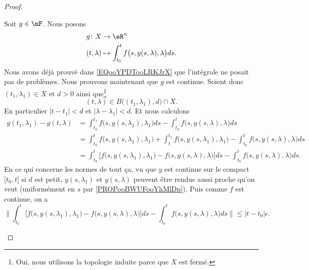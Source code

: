 \begin{proof}
\begin{subproof}
		Soit \( y\in \mF\). Nous posons
		\begin{equation}
			\begin{aligned}
				g\colon X   & \to \eR^n                                                  \\
				(t,\lambda) & \mapsto \int_{t_0}^tf\big( s,y(s,\lambda),\lambda \big)ds.
			\end{aligned}
		\end{equation}
		Nous avons déjà prouvé dans \eqref{EQooYPDTooLRKJrX} que l'intégrale ne posait pas de problèmes. Nous prouvons maintenant que \( g\) est continue. Soient donc \( (t_1,\lambda_1)\in X\) et \( d>0\) ainsi que\footnote{Oui, nous utilisons la topologie induite parce que \( X\) est fermé.}
		\begin{equation}
			(t,\lambda)\in B\big( (t_1,\lambda_1),d \big)\cap X.
		\end{equation}
		En particulier \( | t-t_1 |<d\) et \( | \lambda-\lambda_1 |<d\). Et nous calculons
		\begin{subequations}		\label{SUBEQooOBONooAnUwAO}
			\begin{align}
				g(t_1,\lambda_1)-g(t,\lambda) & =\int_{t_0}^{t_1}f\big( s,y(s,\lambda_1),\lambda_1 \big)ds-\int_{t_0}^tf\big( s,y(s,\lambda),\lambda \big)ds                                                  \\
				                              & =\int_{t_0}^tf\big( s,y(s,\lambda_1),\lambda_1 \big)+\int_t^{t_1}f\big( s,y(s,\lambda_1),\lambda_1 \big)-\int_{t_0}^tf\big( s,y(s,\lambda),\lambda \big)ds    \\
				                              & =\int_{t_0}^t\big[    f\big( s,y(s,\lambda_1),\lambda_1 \big) -f\big( s,y(s,\lambda),\lambda \big) \big]ds-\int_{t_0}^tf\big( s,y(s,\lambda),\lambda \big)ds.
			\end{align}
		\end{subequations}
		En ce qui concerne les normes de tout ça, vu que \( y\) est continue sur le compact \( \mathopen[ t_0,t\mathclose]\) si \( d\) est petit, \( y(s,\lambda_1)\) et \( y(s,\lambda)\) peuvent être rendus aussi proche qu'on veut (uniformément en \( s\) par \ref{PROPooBWUFooYhMlDp}). Puis comme \( f\) est continue, on a
		\begin{equation}
			\| \int_{t_0}^t\big[    f\big( s,y(s,\lambda_1),\lambda_1 \big) -f\big( s,y(s,\lambda),\lambda \big) \big]ds-\int_{t_0}^tf\big( s,y(s,\lambda),\lambda \big)ds \|\leq | t-t_0 | \epsilon.
		\end{equation}

\end{subproof}
\end{proof}
